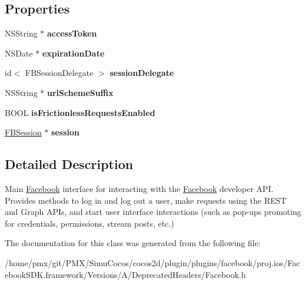 \subsection*{Properties}
\begin{DoxyCompactItemize}
\item 
\mbox{\label{interfaceFacebook_ae445488bf8cda36a5aa66b2ec519dfa6}} 
N\+S\+String $\ast$ {\bfseries access\+Token}
\item 
\mbox{\label{interfaceFacebook_af652da0c9eabf1c9731bcee3b1894798}} 
N\+S\+Date $\ast$ {\bfseries expiration\+Date}
\item 
\mbox{\label{interfaceFacebook_aed1c9f5f848e6e9311f70b8f7b90f725}} 
id$<$ F\+B\+Session\+Delegate $>$ {\bfseries session\+Delegate}
\item 
\mbox{\label{interfaceFacebook_a1013bf40e8de6323dc4484f07905ad85}} 
N\+S\+String $\ast$ {\bfseries url\+Scheme\+Suffix}
\item 
\mbox{\label{interfaceFacebook_a50df91254ba8586fcfcafeb4b930cbff}} 
B\+O\+OL {\bfseries is\+Frictionless\+Requests\+Enabled}
\item 
\mbox{\label{interfaceFacebook_a9eb8d829074ef247f0e17362c774a573}} 
\hyperlink{interfaceFBSession}{F\+B\+Session} $\ast$ {\bfseries session}
\end{DoxyCompactItemize}


\subsection{Detailed Description}
Main \hyperlink{interfaceFacebook}{Facebook} interface for interacting with the \hyperlink{interfaceFacebook}{Facebook} developer A\+PI. Provides methods to log in and log out a user, make requests using the R\+E\+ST and Graph A\+P\+Is, and start user interface interactions (such as pop-\/ups promoting for credentials, permissions, stream posts, etc.) 

The documentation for this class was generated from the following file\+:\begin{DoxyCompactItemize}
\item 
/home/pmx/git/\+P\+M\+X/\+Simu\+Cocos/cocos2d/plugin/plugins/facebook/proj.\+ios/\+Facebook\+S\+D\+K.\+framework/\+Versions/\+A/\+Deprecated\+Headers/Facebook.\+h\end{DoxyCompactItemize}
